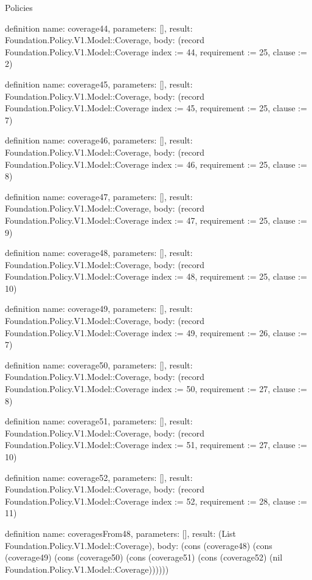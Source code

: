 \begin{lexlean}{Policies}
\begin{semanticmodule}
definition{
  name: coverage44,
  parameters: [],
  result: Foundation.Policy.V1.Model::Coverage,
  body: (record Foundation.Policy.V1.Model::Coverage {index := 44, requirement := 25, clause := 2})
}

definition{
  name: coverage45,
  parameters: [],
  result: Foundation.Policy.V1.Model::Coverage,
  body: (record Foundation.Policy.V1.Model::Coverage {index := 45, requirement := 25, clause := 7})
}

definition{
  name: coverage46,
  parameters: [],
  result: Foundation.Policy.V1.Model::Coverage,
  body: (record Foundation.Policy.V1.Model::Coverage {index := 46, requirement := 25, clause := 8})
}

definition{
  name: coverage47,
  parameters: [],
  result: Foundation.Policy.V1.Model::Coverage,
  body: (record Foundation.Policy.V1.Model::Coverage {index := 47, requirement := 25, clause := 9})
}

definition{
  name: coverage48,
  parameters: [],
  result: Foundation.Policy.V1.Model::Coverage,
  body: (record Foundation.Policy.V1.Model::Coverage {index := 48, requirement := 25, clause := 10})
}

definition{
  name: coverage49,
  parameters: [],
  result: Foundation.Policy.V1.Model::Coverage,
  body: (record Foundation.Policy.V1.Model::Coverage {index := 49, requirement := 26, clause := 7})
}

definition{
  name: coverage50,
  parameters: [],
  result: Foundation.Policy.V1.Model::Coverage,
  body: (record Foundation.Policy.V1.Model::Coverage {index := 50, requirement := 27, clause := 8})
}

definition{
  name: coverage51,
  parameters: [],
  result: Foundation.Policy.V1.Model::Coverage,
  body: (record Foundation.Policy.V1.Model::Coverage {index := 51, requirement := 27, clause := 10})
}

definition{
  name: coverage52,
  parameters: [],
  result: Foundation.Policy.V1.Model::Coverage,
  body: (record Foundation.Policy.V1.Model::Coverage {index := 52, requirement := 28, clause := 11})
}

definition{
  name: coveragesFrom48,
  parameters: [],
  result: (List Foundation.Policy.V1.Model::Coverage),
  body: (cons (coverage48) (cons (coverage49) (cons (coverage50) (cons (coverage51) (cons (coverage52) (nil Foundation.Policy.V1.Model::Coverage))))))
}


\end{semanticmodule}
\end{lexlean}
